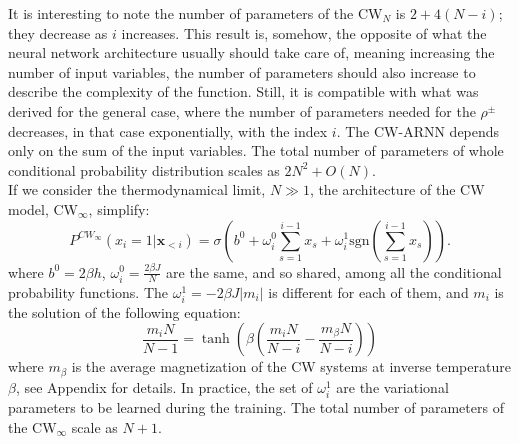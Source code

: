 \documentclass[aps,physrev,10pt,floatfix,reprint]{revtex4-2}
\begin{document}
It is interesting to note the number of parameters of the CW$_N$ is $2+4(N-i)$; they decrease as $i$ increases. This result is, somehow, the opposite of what the neural network architecture usually should take care of, meaning increasing the number of input variables, the number of parameters should also increase to describe the complexity of the function. Still, it is compatible with what was derived for the general case, where the number of parameters needed for the $\rho^{\pm}$ decreases, in that case exponentially, with the index $i$. The CW-ARNN depends only on the sum of the input variables.
The total number of parameters of whole conditional probability distribution scales as $2N^2+ O(N)$. \\
If we consider the thermodynamical limit, $N \gg 1$, the architecture of the CW model, CW$_{\infty}$, simplify:
\begin{equation*}
    P^{CW_{\infty}}\left(x_{i}=1|\mathbf{x}_{<i}\right) =  \sigma \left(b^0+\omega_{i}^0\sum_{s=1}^{i-1}x_{s} + \omega_i^1 \text{sgn}(\sum_{s=1}^{i-1}x_{s})\right).
\end{equation*}
where $b^0=2\beta h$, $\omega^0_i = \frac{2\beta J}{N}$ are the same, and so shared, among all the conditional probability functions. The $\omega^1_i = -2\beta J |m_i|$ is different for each of them, and $m_i$ is the solution of the following equation:
\begin{equation}
    \frac{m_i N}{N-1} = \tanh \left( \beta(\frac{m_i N}{N - i} - \frac{m_{\beta}N}{N-i}) \right)
    \label{eq:extrem_i}
    \end{equation}
where $m_{\beta}$ is the average magnetization of the CW systems at inverse temperature $\beta$, see Appendix for details. In practice, the set of $\omega^1_i$ are the variational parameters to be learned during the training. The total number of parameters of the CW$_{\infty}$ scale as $N+1$.
    
\end{document}
